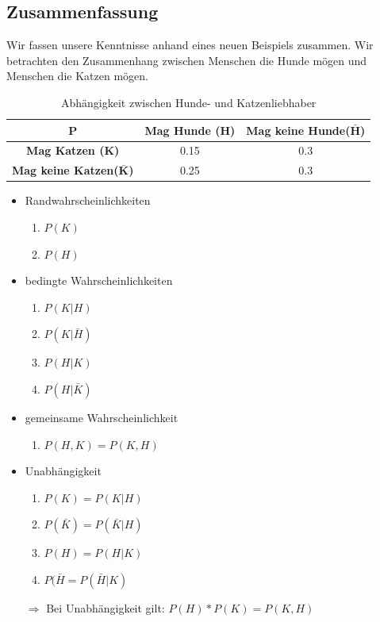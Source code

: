\documentclass[a4paper]{article}
\theoremstyle{definition}
\theoremstyle{example}
\begin{document}
\subsection{Zusammenfassung}
Wir fassen unsere Kenntnisse anhand eines neuen Beispiels zusammen. Wir betrachten den Zusammenhang zwischen Menschen die Hunde mögen und Menschen die Katzen mögen.
\begin{table}[h!]
	\begin{center}
		\caption{Abhängigkeit zwischen Hunde- und Katzenliebhaber}
		\label{tab: table1}
		\begin{tabular}{c|c|c}
			\textbf{P} & \textbf{Mag Hunde (H)} & \textbf{Mag keine Hunde($\mathbf{\bar{H}}$)}\\
			\hline
			\textbf{Mag Katzen (K)} & 0.15 & 0.3\\
			\textbf{Mag keine Katzen($\mathbf{\bar{K}}$)} & 0.25 & 0.3
		\end{tabular}
	\end{center}
\end{table}
\begin{itemize}
	\item {Randwahrscheinlichkeiten
		\begin{enumerate}
			\item $P(K)$
			\item $P(H)$
		\end{enumerate}			
	}
	\item {bedingte Wahrscheinlichkeiten
		\begin{enumerate}
			\item $P(K|H)$
			\item $P(K|\bar{H})$
			\item $P(H|K)$
			\item $P(H|\bar{K})$
		\end{enumerate}
	}
	\item {gemeinsame Wahrscheinlichkeit
		\begin{enumerate}
			\item $P(H,K) = P(K,H)$
		\end{enumerate}
	}
	\item{Unabhängigkeit
		\begin{enumerate}
			\item $P(K) = P(K|H)$
			\item $P(\bar{K}) = P(\bar{K}|H)$
			\item $P(H) = P(H|K)$
			\item $P(\bar{H} = P(\bar{H}|K)$
		\end{enumerate}
		$\Rightarrow$ Bei Unabhängigkeit gilt: $P(H)*P(K) = P(K,H)$
	}
\end{itemize}
\end{document}
